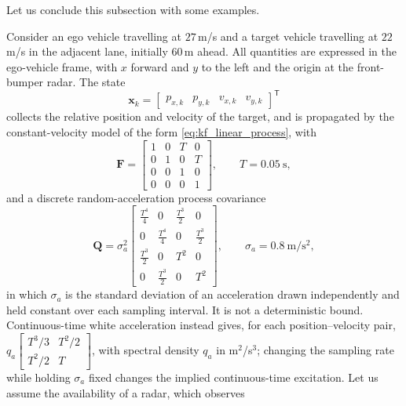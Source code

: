 Let us conclude this subsection with some examples.


\begin{example}
\label{ex:ekf-radar-cutin}
Consider an ego vehicle travelling at $27$\,m/s and a target vehicle travelling
at $22$\,m/s in the adjacent lane, initially $60$\,m ahead. All quantities are
expressed in the ego-vehicle frame, with $x$ forward and $y$ to the left and the
origin at the front-bumper radar. The state
\begin{equation}
\mathbf{x}_k=
\begin{bmatrix}
p_{x,k} & p_{y,k} & v_{x,k} & v_{y,k}
\end{bmatrix}^{\mathsf T}
\end{equation}
collects the relative position and velocity of the target, and is propagated by
the constant-velocity model of the form
\eqref{eq:kf_linear_process}, with
\begin{equation}
\mathbf{F}=
\begin{bmatrix}
1&0&T&0\\
0&1&0&T\\
0&0&1&0\\
0&0&0&1
\end{bmatrix},
\qquad T=0.05\ \mathrm{s},
\end{equation}
and a discrete random-acceleration process covariance
\begin{equation}
\mathbf{Q}=\sigma_a^{2}
\begin{bmatrix}
\tfrac{T^{4}}{4}&0&\tfrac{T^{3}}{2}&0\\[2pt]
0&\tfrac{T^{4}}{4}&0&\tfrac{T^{3}}{2}\\[2pt]
\tfrac{T^{3}}{2}&0&T^{2}&0\\[2pt]
0&\tfrac{T^{3}}{2}&0&T^{2}
\end{bmatrix},
\qquad \sigma_a=0.8\ \mathrm{m/s^{2}},
\end{equation}
in which $\sigma_a$ is the standard deviation of an acceleration drawn independently and held constant over each sampling interval. It is not a deterministic bound. Continuous-time white acceleration instead gives, for each position--velocity pair, $q_a\left[\begin{smallmatrix}T^3/3&T^2/2\\T^2/2&T\end{smallmatrix}\right]$, with spectral density $q_a$ in m$^2$/s$^3$; changing the sampling rate while holding $\sigma_a$ fixed changes the implied continuous-time excitation. 
Let us assume the availability of a radar, which observes
\begin{equation}

\end{equation}
\end{example}
